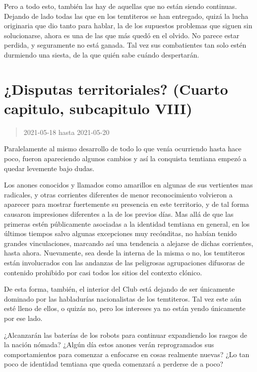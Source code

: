 \documentclass[
  spanish,
]{book}
\begin{document}
Pero a todo esto, también las hay de aquellas que no están siendo continuas. Dejando de lado todas las que en los temtiteros se han entregado, quizá la lucha originaria que dio tanto para hablar, la de los supuestos problemas que siguen sin solucionarse, ahora es una de las que más quedó en el olvido. No parece estar perdida, y seguramente no está ganada. Tal vez sus combatientes tan solo estén durmiendo una siesta, de la que quién sabe cuándo despertarán.

\hypertarget{disputas-territoriales-cuarto-capitulo-subcapitulo-viii}{%
\section{¿Disputas territoriales? (Cuarto capitulo, subcapitulo VIII)}\label{disputas-territoriales-cuarto-capitulo-subcapitulo-viii}}

\begin{quote}
2021-05-18 hasta 2021-05-20
\end{quote}

Paralelamente al mismo desarrollo de todo lo que venía ocurriendo hasta hace poco, fueron apareciendo algunos cambios y así la conquista temtiana empezó a quedar levemente bajo dudas.

Los anones conocidos y llamados como amarillos en algunas de sus vertientes mas radicales, y otras corrientes diferentes de menor reconocimiento volvieron a aparecer para mostrar fuertemente su presencia en este territorio, y de tal forma causaron impresiones diferentes a la de los previos días. Mas allá de que las primeras estén públicamente asociadas a la identidad temtiana en general, en los últimos tiempos salvo algunas excepciones muy recónditas, no habían tenido grandes vinculaciones, marcando así una tendencia a alejarse de dichas corrientes, hasta ahora. Nuevamente, sea desde la interna de la misma o no, los temtiteros están involucrados con las andanzas de las peligrosas agrupaciones difusoras de contenido prohibido por casi todos los sitios del contexto clónico.

De esta forma, también, el interior del Club está dejando de ser únicamente dominado por las habladurías nacionalistas de los temtiteros. Tal vez este aún esté lleno de ellos, o quizás no, pero los intereses ya no están yendo únicamente por ese lado.

¿Alcanzarán las baterías de los robots para continuar expandiendo los rasgos de la nación nómada? ¿Algún día estos anones verán reprogramados sus comportamientos para comenzar a enfocarse en cosas realmente nuevas? ¿Lo tan poco de identidad temtiana que queda comenzará a perderse de a poco?
\end{document}
